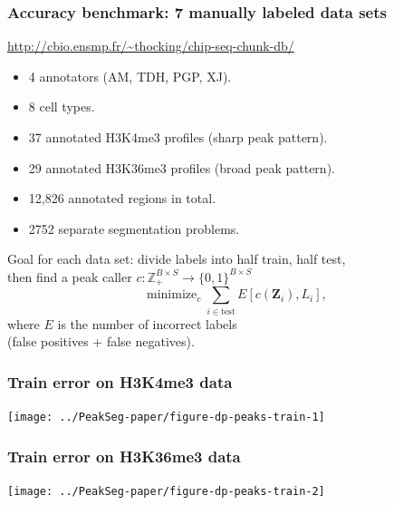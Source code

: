\documentclass{beamer}
\DeclareMathOperator*{\minimize}{minimize}
\newcommand{\ZZ}{\mathbb Z}
\begin{document}
\begin{frame}
  \frametitle{Accuracy benchmark: 7 manually labeled data sets}
  \url{http://cbio.ensmp.fr/~thocking/chip-seq-chunk-db/}
  \begin{itemize}
  \item 4 annotators (AM, TDH, PGP, XJ).
  \item 8 cell types.
  \item 37 annotated H3K4me3 profiles (sharp peak pattern).
  \item 29 annotated H3K36me3 profiles (broad peak pattern).
  \item 12,826 annotated regions in total.
  \item 2752 separate segmentation problems.
  \end{itemize}
  Goal for each data set: divide labels into half train, half test,\\
  then find a peak caller $c:\ZZ_+^{B\times S} \rightarrow
  \{0,1\}^{B\times S}$
  \begin{equation*}
    \minimize_c \sum_{i\in\text{test}} E[c(\mathbf Z_i),  L_i],
  \end{equation*}
  where $E$ is the number of incorrect labels\\(false positives + false
  negatives).
\end{frame}

\begin{frame}
  \frametitle{Train error on H3K4me3 data}
  \texttt{[image: ../PeakSeg-paper/figure-dp-peaks-train-1]}
\end{frame}

\begin{frame}
  \frametitle{Train error on H3K36me3 data}
  \texttt{[image: ../PeakSeg-paper/figure-dp-peaks-train-2]}
\end{frame}
\end{document}
